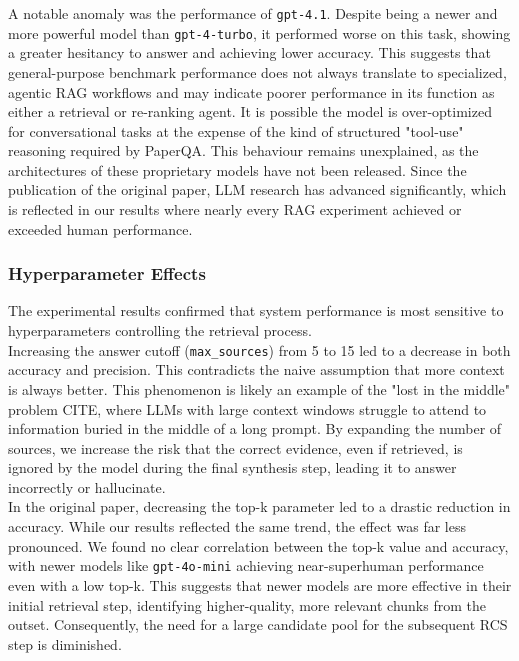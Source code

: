 A notable anomaly was the performance of \texttt{gpt-4.1}. Despite being a newer and more powerful model than \texttt{gpt-4-turbo}, it performed worse on this task, showing a greater hesitancy to answer and achieving lower accuracy. This suggests that general-purpose benchmark performance does not always translate to specialized, agentic RAG workflows and may indicate poorer performance in its function as either a retrieval or re-ranking agent. It is possible the model is over-optimized for conversational tasks at the expense of the kind of structured "tool-use" reasoning required by PaperQA. This behaviour remains unexplained, as the architectures of these proprietary models have not been released. Since the publication of the original paper, LLM research has advanced significantly, which is reflected in our results where nearly every RAG experiment achieved or exceeded human performance. \\

\subsubsection{Hyperparameter Effects}
The experimental results confirmed that system performance is most sensitive to hyperparameters controlling the retrieval process. \\

Increasing the answer cutoff (\texttt{max\_sources}) from 5 to 15 led to a decrease in both accuracy and precision. This contradicts the naive assumption that more context is always better. This phenomenon is likely an example of the "lost in the middle" problem CITE, where LLMs with large context windows struggle to attend to information buried in the middle of a long prompt. By expanding the number of sources, we increase the risk that the correct evidence, even if retrieved, is ignored by the model during the final synthesis step, leading it to answer incorrectly or hallucinate. \\

In the original paper, decreasing the top-k parameter led to a drastic reduction in accuracy. While our results reflected the same trend, the effect was far less pronounced. We found no clear correlation between the top-k value and accuracy, with newer models like \texttt{gpt-4o-mini} achieving near-superhuman performance even with a low top-k. This suggests that newer models are more effective in their initial retrieval step, identifying higher-quality, more relevant chunks from the outset. Consequently, the need for a large candidate pool for the subsequent RCS step is diminished. \\

